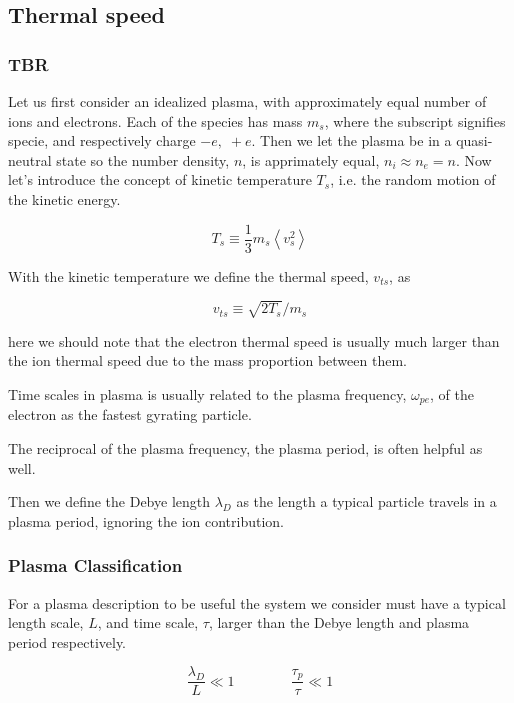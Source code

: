 		\subsection{Thermal speed}

		\citet{goldston_introduction_1995}

		\subsubsection{TBR}
        Let us first consider an idealized plasma, with approximately equal number
        of ions and electrons. Each of the species has mass \(m_s\), where the
        subscript signifies specie, and respectively charge \(-e, \; +e\). Then we let the plasma be in a quasi-neutral state
        so the number density, \(n\), is apprimately equal, \(n_i\approx n_e = n\).
        Now let's introduce the concept of kinetic temperature \(T_s\), i.e. the random
        motion of the kinetic energy.

        \[T_s \equiv \frac{1}{3}m_s \left< v_s^2 \right> \]

        With the kinetic temperature we define the thermal speed, \(v_{ts}\), as

        \[ v_{ts} \equiv \sqrt{2T_s}/m_s \]

        here we should note that the electron thermal speed is usually much larger
        than the ion thermal speed due to the mass proportion between them.

        Time scales in plasma is usually related to the plasma frequency, \(\omega_{pe}\), of the
        electron as the fastest gyrating particle.

        The reciprocal of the plasma frequency, the plasma period,  is often
        helpful as well.

        Then we define the Debye length \(\lambda_D\) as the length a typical particle
        travels in a plasma period, ignoring the ion contribution.



		\subsubsection{Plasma Classification}
        For a plasma description to be useful the system we consider must have
        a typical length scale, \(L\), and time scale, \(\tau\), larger than the Debye length and plasma
        period respectively.

        \[\frac{\lambda_D}{L} \ll 1  \qquad{} \qquad \frac{\tau_p}{\tau} \ll 1 \]


















